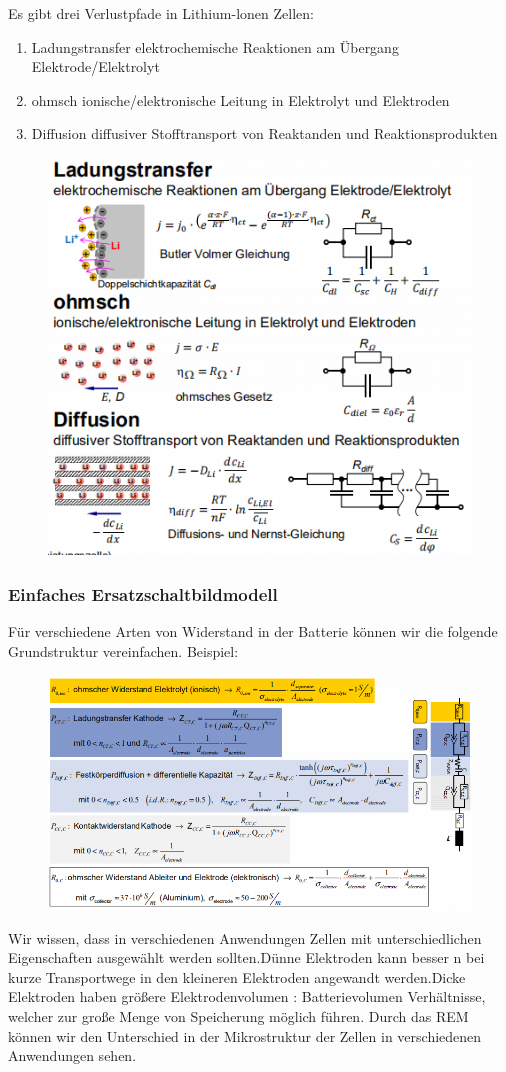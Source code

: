 \documentclass[12pt,UTF8]{article}
\begin{document}
Es gibt drei Verlustpfade in Lithium-lonen Zellen:
\begin{enumerate}
    \item Ladungstransfer elektrochemische Reaktionen am Übergang Elektrode/Elektrolyt
    \item ohmsch ionische/elektronische Leitung in Elektrolyt und Elektroden
    \item Diffusion diffusiver Stofftransport von Reaktanden und Reaktionsprodukten
\end{enumerate}
\begin{figure}[H]
    \centering
    \includegraphics[width=.5\linewidth]{Diagramme/fig3_1_5.png}
    \caption{}
\end{figure}

\subsubsection{Einfaches Ersatzschaltbildmodell}
Für verschiedene Arten von Widerstand in der Batterie können wir die folgende Grundstruktur vereinfachen. Beispiel:

\begin{figure}[H]
    \centering
    \includegraphics[width=.8\linewidth]{Diagramme/fig3_1_6.png}
    \caption{}
\end{figure}

Wir wissen, dass in verschiedenen Anwendungen Zellen mit unterschiedlichen Eigenschaften ausgewählt werden sollten.Dünne Elektroden kann besser n bei kurze Transportwege in den kleineren Elektroden angewandt werden.Dicke Elektroden haben größere Elektrodenvolumen : Batterievolumen Verhältnisse, welcher zur große Menge von Speicherung möglich führen.
Durch das REM können wir den Unterschied in der Mikrostruktur der Zellen in verschiedenen Anwendungen sehen.
\end{document}

